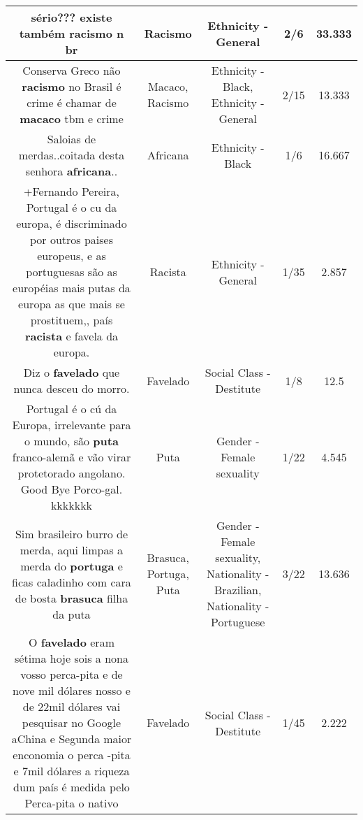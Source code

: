 \documentclass[11pt]{article}
\newlength\mylength
\begin{document}
\begin{center}
\begin{longtable}{|C{.65\mylength}|C{.30\mylength}|C{.12\mylength}|C{.12\mylength}|C{.12\mylength}|}
  \small sério??? existe também \textbf{racismo} n br\normalsize   & Racismo & Ethnicity - General & 2/6 & 33.333 \\  \hline
  \small Conserva Greco não \textbf{racismo} no Brasil é crime é chamar de \textbf{macaco} tbm e crime\normalsize   & Macaco, Racismo & Ethnicity - Black, Ethnicity - General & 2/15 & 13.333 \\  \hline
  \small Saloias de merdas..coitada desta senhora \textbf{africana}..\normalsize   & Africana & Ethnicity - Black & 1/6 & 16.667 \\  \hline
  \small +Fernando Pereira, Portugal é o cu da europa, é discriminado por outros paises europeus, e as portuguesas são as européias mais putas da europa as que mais se prostituem,, país \textbf{racista} e favela da europa.\normalsize   & Racista & Ethnicity - General & 1/35 & 2.857 \\  \hline
  \small Diz o \textbf{favelado} que nunca desceu do morro.\normalsize   & Favelado & Social Class - Destitute & 1/8 & 12.5 \\  \hline
  \small Portugal é o cú da Europa, irrelevante para o mundo, são \textbf{puta} franco-alemã e vão virar protetorado angolano. Good Bye Porco-gal. kkkkkkk\normalsize   & Puta & Gender - Female sexuality & 1/22 & 4.545 \\  \hline
  \small Sim brasileiro burro de merda, aqui limpas a merda do \textbf{portuga} e ficas caladinho com cara de bosta \textbf{brasuca} filha da puta\normalsize   & Brasuca, Portuga, Puta & Gender - Female sexuality, Nationality - Brazilian, Nationality - Portuguese & 3/22 & 13.636 \\  \hline
  \small O \textbf{favelado} eram sétima hoje sois a nona vosso perca-pita e de nove mil dólares nosso e de 22mil dólares vai pesquisar no Google aChina e Segunda maior enconomia o perca -pita e 7mil dólares a riqueza dum país é medida pelo Perca-pita  o nativo\normalsize   & Favelado & Social Class - Destitute & 1/45 & 2.222 \\  \hline

\end{longtable}
\end{center}
\end{document}
